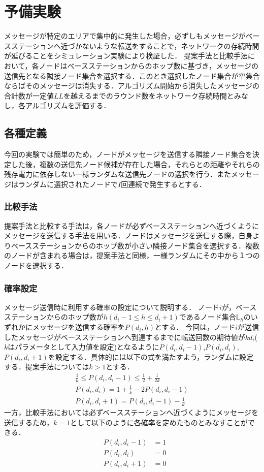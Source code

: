 \documentclass[a4j,10pt]{jarticle}
\begin{document}

\section{予備実験}
メッセージが特定のエリアで集中的に発生した場合，必ずしもメッセージがベースステーションへ近づかないような転送をすることで，ネットワークの存続時間が延びることをシミュレーション実験により検証した．
提案手法と比較手法において，各ノードはベースステーションからのホップ数に基づき，メッセージの送信先となる隣接ノード集合を選択する．このとき選択したノード集合が空集合ならばそのメッセージは消失する．アルゴリズム開始から消失したメッセージの合計数が一定値$LL$を越えるまでのラウンド数をネットワーク存続時間とみなし，各アルゴリズムを評価する．

\subsection{各種定義}
今回の実験では簡単のため，ノードがメッセージを送信する隣接ノード集合を決定した後，複数の送信先ノード候補が存在した場合，それらとの距離やそれらの残存電力に依存しない一様ランダムな送信先ノードの選択を行う．またメッセージはランダムに選択されたノードで$I$回連続で発生するとする．


\subsubsection{比較手法}
提案手法と比較する手法は，各ノードが必ずベースステーションへ近づくようにメッセージを送信する手法を用いる．ノードはメッセージを送信する際，自身よりベースステーションからのホップ数が小さい隣接ノード集合を選択する．複数のノードが含まれる場合は，提案手法と同様，一様ランダムにその中から１つのノードを選択する．

\newpage
\subsubsection{確率設定}
メッセージ送信時に利用する確率の設定について説明する．
ノード$i$が，ベースステーションからのホップ数が$h ( d_i-1 \le h \le d_i+1 )$であるノード集合$\mathbb{L}_{h}$のいずれかにメッセージを送信する確率を$P(d_i,h)$とする．
今回は，ノード$i$が送信したメッセージがベースステーションへ到達するまでに転送回数の期待値が$kd_i$($k$はパラメータとして入力値を設定)となるように$P(d_i,d_i-1)$,$P(d_i,d_i)$,$P(d_i,d_i+1)$を設定する．具体的には以下の式を満たすよう，ランダムに設定する．提案手法については$k > 1$とする．
\begin{eqnarray*}
\frac{1}{k} \le P(d_i,d_i-1) \le \frac{1}{2} + \frac{1}{2k} \\
P(d_i,d_i) = 1 + \frac{1}{k} -2P(d_i,d_i-1) \\
P(d_i,d_i+1) = P(d_i,d_i-1) - \frac{1}{k}
\end{eqnarray*}
一方，比較手法においては必ずベースステーションへ近づくようにメッセージを送信するため，$k=1$として以下のように各確率を定めたものとみなすことができる．
\begin{eqnarray*}
& P(d_i,d_i-1) & = 1 \\
& P(d_i,d_i) & = 0 \\
& P(d_i,d_i+1) & = 0
\end{eqnarray*}
\end{document}
